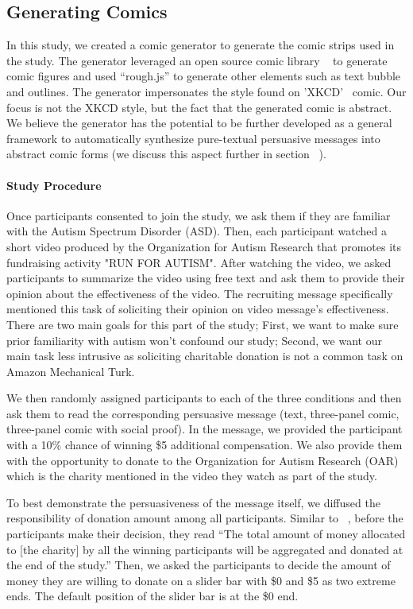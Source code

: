 \subsection{Generating Comics}
In this study, we created a comic generator to generate the comic strips used in the study. The generator leveraged an open source comic library ~\cite{cmx.io} to generate comic figures and used ``rough.js'' \cite{rough.js} to generate other elements such as text bubble and outlines. The generator impersonates the style found on 'XKCD'~\cite{munroe2009xkcd} comic. Our focus is not the XKCD style, but the fact that the generated comic is abstract. We believe the generator has the potential to be further developed as a general framework to automatically synthesize pure-textual persuasive messages into abstract comic forms (we discuss this aspect further in section ~).

\paragraph{Study Procedure} 
Once participants consented to join the study, we ask them if they are familiar with the Autism Spectrum Disorder (ASD). Then, each participant watched a short video produced by the Organization for Autism Research that promotes its fundraising activity "RUN FOR AUTISM". After watching the video, we asked participants to summarize the video using free text and ask them to provide their opinion about the effectiveness of the video. The recruiting message specifically mentioned this task of soliciting their opinion on video message's effectiveness. There are two main goals for this part of the study; First, we want to make sure prior familiarity with autism won't confound our study; Second, we want our main task less intrusive as soliciting charitable donation is not a common task on Amazon Mechanical Turk.  

We then randomly assigned participants to each of the three conditions and then ask them to read the corresponding persuasive message (text, three-panel comic, three-panel comic with social proof). In the message, we provided the participant with a 10\% chance of winning \$5 additional compensation. We also provide them with the opportunity to donate to the Organization for Autism Research (OAR) which is the charity mentioned in the video they watch as part of the study.

To best demonstrate the persuasiveness of the message itself, we diffused the responsibility of donation amount among all participants. Similar to ~\textcite{lee2013does}, before the participants make their decision, they read ``The total amount of money allocated to [the charity] by all the winning participants will be aggregated and donated at the end of the study.'' Then, we asked the participants to decide the amount of money they are willing to donate on a slider bar with \$0 and \$5 as two extreme ends. The default position of the slider bar is at the \$0 end.

